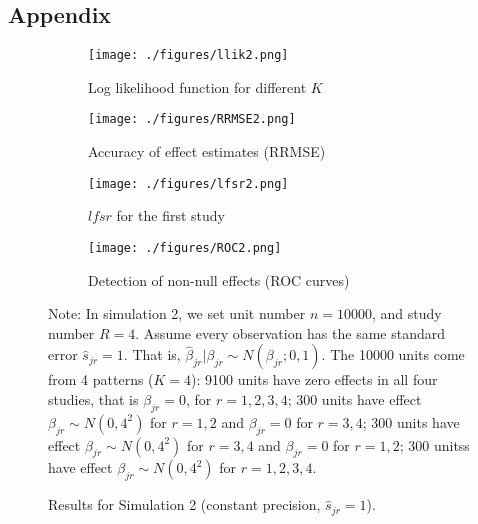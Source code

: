 \documentclass[12pt]{article}
\def\lfsr{\textit{lfsr}}
\begin{document}
\newpage

\begin{appendix}
\section{Appendix}

\begin{figure}[ht]
\begin{subfigure}{0.5\textwidth}
\centering\texttt{[image: ./figures/llik2.png]}
    \caption{Log likelihood function for different $K$} 
\label{fig:llik2}
\end{subfigure}
\begin{subfigure}{0.5\textwidth}
\centering\texttt{[image: ./figures/RRMSE2.png]}
    \caption{Accuracy of effect estimates (RRMSE)} \label{fig:rrmse2}
\end{subfigure}
\begin{subfigure}{0.5\textwidth}
\centering\texttt{[image: ./figures/lfsr2.png]}
    \caption{$\lfsr$ for the first study} \label{fig:lfsr2}
\end{subfigure}
\begin{subfigure}{0.5\textwidth}
\centering\texttt{[image: ./figures/ROC2.png]}
    \caption{Detection of non-null effects (ROC curves)} \label{fig:roc2}
\end{subfigure}
\caption{Results for Simulation 2 (constant precision, $\hat s_{jr}=1$).} 
\medskip
\small
Note: In simulation 2, we set unit number $n = 10000$, and study number $R = 4$. Assume every observation has the same standard error $\hat s_{jr}=1$. That is, $\hat\beta_{jr}|\beta_{jr}\sim N(\beta_{jr};0,1)$. The 10000 units come from 4 patterns ($K=4$): 9100 units have zero effects in all four studies, that is $\beta_{jr}=0$, for $r = 1,2,3,4$; 300 units have effect $\beta_{jr}\sim N(0,4^2)$ for $r =1, 2$ and $\beta_{jr}=0$ for $r =3, 4$; 300 units have effect $\beta_{jr}\sim N(0,4^2)$ for $r =3, 4$ and $\beta_{jr}=0$ for $r = 1, 2$; 300 unitss have effect $\beta_{jr}\sim N(0,4^2)$ for $r =1,2,3,4$.
\label{fig:sim2}
\end{figure}


\end{appendix}

\newpage



\end{document}
